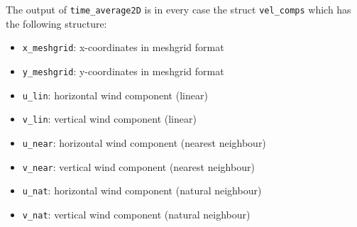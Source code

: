 \documentclass[
12pt,
a4paper,
twoside]
{article}
\begin{document}
The output of \verb!time_average2D! is in every case the struct \verb!vel_comps! which has the following structure:
\begin{itemize}
\item \verb!x_meshgrid!: x-coordinates in meshgrid format
\item \verb!y_meshgrid!: y-coordinates in meshgrid format
\item \verb!u_lin!: horizontal wind component (linear)
\item \verb!v_lin!: vertical wind component (linear)
\item \verb!u_near!: horizontal wind component (nearest neighbour)
\item \verb!v_near!: vertical wind component (nearest neighbour)
\item \verb!u_nat!: horizontal wind component (natural neighbour)
\item \verb!v_nat!: vertical wind component (natural neighbour)
\end{itemize}
\end{document}
